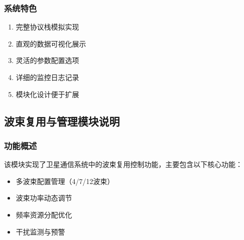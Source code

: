 \documentclass[12pt]{article}
\begin{document}
\subsubsection{系统特色}
\begin{enumerate}
    \item 完整协议栈模拟实现
    \item 直观的数据可视化展示
    \item 灵活的参数配置选项
    \item 详细的监控日志记录
    \item 模块化设计便于扩展
\end{enumerate}


\subsection{波束复用与管理模块说明}

\subsubsection{功能概述}
该模块实现了卫星通信系统中的波束复用控制功能，主要包含以下核心功能：
\begin{itemize}
    \item 多波束配置管理（4/7/12波束）
    \item 波束功率动态调节
    \item 频率资源分配优化
    \item 干扰监测与预警
\end{itemize}
\end{document}

